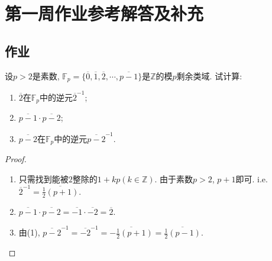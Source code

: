 \documentclass{../solutions-cn}
\begin{document}
\section*{第一周作业参考解答及补充}

\subsection*{作业}

\begin{exercise}[习题1.1.6]
    设$p > 2$是素数, $\mathbb{F}_p = \{\overline{0}, \overline{1}, \overline{2}, \cdots, \overline{p-1}\}$是$\mathbb{Z}$的模$p$剩余类域. 试计算: 
    \begin{enumerate}[(1)]
        \item $\overline{2}$在$\mathbb{F}_p$中的逆元$\overline{2}^{-1}$;
        \item $\overline{p - 1} \cdot \overline{p - 2}$;
        \item $\overline{p - 2}$在$\mathbb{F}_p$中的逆元$\overline{p-2}^{-1}$.
    \end{enumerate}
\end{exercise}

\begin{proof}
\begin{enumerate}[(1)]
    \item 只需找到能被$2$整除的$1 + kp(k \in \mathbb{Z})$. 由于素数$p > 2$, $p + 1$即可. i.e. $\overline{2}^{-1} = \overline{\frac12(p + 1)}$.
    \item $\overline{p - 1} \cdot \overline{p - 2} = \overline{-1} \cdot \overline{-2} = \overline{2}$.
    \item 由(1), $\overline{p - 2}^{-1} = \overline{-2}^{-1} = \overline{-\frac12(p + 1)} = \overline{\frac12(p - 1)}$.
\end{enumerate}
\end{proof}
\end{document}
